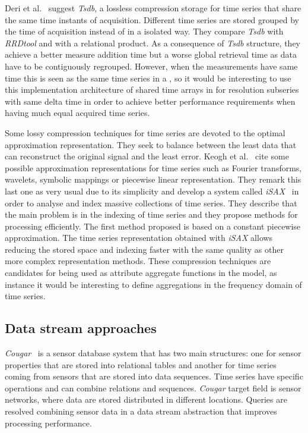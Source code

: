 Deri et al.~\cite{deri12:tsdb_compressed_database} suggest
\emph{Tsdb}, a lossless compression storage  for time
series that share the same time instants of acquisition. Different
time series are stored grouped by the time of acquisition instead of
in a isolated way.  They compare \emph{Tsdb} with \emph{RRDtool} and
with a relational product. As a consequence of \emph{Tsdb} structure,
they achieve a better measure addition time but a worse global
retrieval time as data have to be contiguously regrouped. However,
when the measurements have same time this is seen as the same time
series in a , so it would be interesting to use this
implementation architecture of shared time arrays in  for
resolution subseries with same delta time in order to achieve better
performance requirements when having much equal acquired time series.

Some lossy compression techniques for time series are devoted to the
optimal approximation representation. They seek to balance between the
least data that can reconstruct the original signal and the least
error. Keogh et al.~\cite{keogh01} cite some possible approximation
representations for time series such as Fourier transforms, wavelets,
symbolic mappings or piecewise linear representation. They remark this
last one as very usual due to its simplicity and develop a system
called \emph{iSAX}~\cite{keogh08:isax,keogh10:isax} in order to
analyse and index massive collections of time series. They describe
that the main problem is in the indexing of time series and they
propose methods for processing efficiently. The first method proposed
is based on a constant piecewise approximation. The time series
representation obtained with \emph{iSAX} allows reducing the stored
space and indexing faster with the same quality as other more complex
representation methods.  These compression techniques are candidates
for being used as attribute aggregate functions in the 
model, as instance it would be interesting to define aggregations in
the frequency domain of time series.


\subsection{Data stream approaches}

\emph{Cougar}~\cite{bonnet01} is a sensor database system that has two
main structures: one for sensor properties that are stored into
relational tables and another for time series coming from sensors that
are stored into data sequences. Time series have specific operations
and can combine relations and sequences. \emph{Cougar} target field is
sensor networks, where data are stored distributed in different
locations. Queries are resolved combining sensor data in a data stream
abstraction that improves processing performance.

